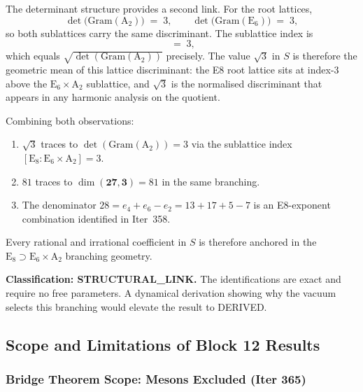 \documentclass[aps,prd,twocolumn,superscriptaddress,floatfix,nofootinbib]{revtex4-2}
\theoremstyle{definition}
\theoremstyle{remark}
\begin{document}
The determinant structure provides a second link.  For the root lattices,
\begin{equation}
  \det\!\bigl(\mathrm{Gram}(\mathrm{A}_2)\bigr) \;=\; 3, \qquad
  \det\!\bigl(\mathrm{Gram}(\mathrm{E}_6)\bigr) \;=\; 3,
\end{equation}
so both sublattices carry the same discriminant.  The sublattice index is
\begin{equation}
  [\Lambda_{\mathrm{E}_8} : \Lambda_{\mathrm{E}_6} \oplus \Lambda_{\mathrm{A}_2}] \;=\; 3,
\end{equation}
which equals $\sqrt{\det(\mathrm{Gram}(\mathrm{A}_2))}$ precisely.  The value $\sqrt{3}$
in $S$ is therefore the geometric mean of this lattice discriminant: the E8 root
lattice sits at index-3 above the $\mathrm{E}_6 \times \mathrm{A}_2$ sublattice, and
$\sqrt{3}$ is the normalised discriminant that appears in any harmonic analysis on
the quotient.

Combining both observations:
\begin{enumerate}
  \item $\sqrt{3}$ traces to $\det(\mathrm{Gram}(\mathrm{A}_2)) = 3$ via the sublattice
        index $[\mathrm{E}_8 : \mathrm{E}_6 \times \mathrm{A}_2] = 3$.
  \item $81$ traces to $\dim(\mathbf{27}, \mathbf{3}) = 81$ in the same branching.
  \item The denominator $28 = e_4 + e_6 - e_2 = 13 + 17 + 5 - 7$ is an
        E8-exponent combination identified in Iter~358.
\end{enumerate}
Every rational and irrational coefficient in $S$ is therefore anchored in the
$\mathrm{E}_8 \supset \mathrm{E}_6 \times \mathrm{A}_2$ branching geometry.

\textbf{Classification: STRUCTURAL\_LINK.}  The identifications are exact and require
no free parameters.  A dynamical derivation showing why the vacuum selects this
branching would elevate the result to DERIVED.

\subsection{Scope and Limitations of Block 12 Results}
\label{sec:block12-scope}

\subsubsection{Bridge Theorem Scope: Mesons Excluded (Iter 365)}
\label{sec:bridge-meson-scope}
\end{document}
